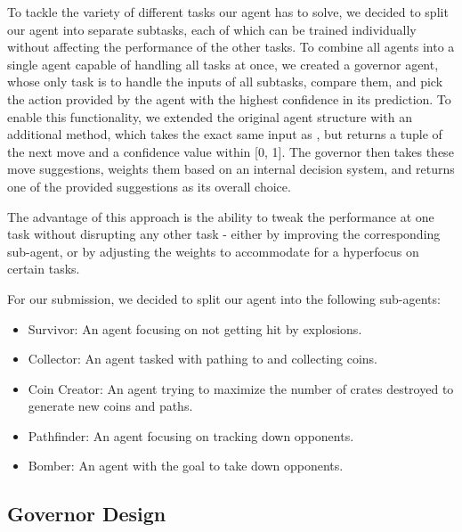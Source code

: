To tackle the variety of different tasks our agent has to solve, we decided to split our agent into separate subtasks,
each of which can be trained individually without affecting the performance of the other tasks.
To combine all agents into a single agent capable of handling all tasks at once, we created a governor agent, whose only
task is to handle the inputs of all subtasks, compare them, and pick the action provided by the agent with the highest
confidence in its prediction.
To enable this functionality, we extended the original agent structure with an additional 
method, which takes the exact same input as , but returns a tuple of the next move and a confidence
value within [0, 1].
The governor then takes these move suggestions, weights them based on an internal decision system, and returns one of
the provided suggestions as its overall choice.

The  advantage of this approach is the ability to tweak the performance at one task without disrupting any other task -
either by improving the corresponding sub-agent, or by adjusting the weights to accommodate for a hyperfocus on certain
tasks.

For our submission, we decided to split our agent into the following sub-agents:
\begin{itemize}
  \item Survivor: An agent focusing on not getting hit by explosions.
  \item Collector: An agent tasked with pathing to and collecting coins.
  \item Coin Creator: An agent trying to maximize the number of crates destroyed to generate new coins and paths.
  \item Pathfinder: An agent focusing on tracking down opponents.
  \item Bomber: An agent with the goal to take down opponents.
\end{itemize}

\subsection{Governor Design}

